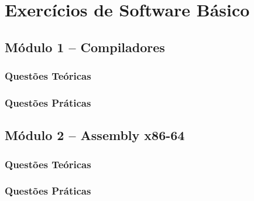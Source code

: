 \documentclass[11pt, a4paper]{book}
\begin{document}
\listoflistings

\chapter{Exercícios de Software Básico}
    \section{Módulo 1 -- Compiladores}
        \subsection{Questões Teóricas}
        

        \subsection{Questões Práticas}
        

    \section{Módulo 2 -- Assembly x86-64}
        \subsection{Questões Teóricas}
        
			
        \subsection{Questões Práticas}
        
		

\end{document}
